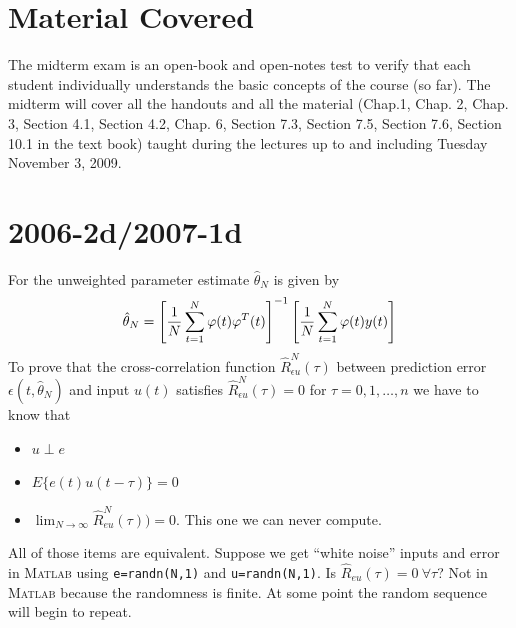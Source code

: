 
\mainmatter
\setcounter{page}{1}

\lectureseries[\course]{\course}

\date{November 5, 2009}

\setaddress

\setcounter{lecture}{20}
\setcounter{chapter}{20}


\section{Material Covered}
The midterm exam is an open-book and open-notes test to verify that each student individually understands the basic concepts of the course (so far). The midterm will cover all the handouts and all the material (Chap.1, Chap. 2, Chap. 3,  Section 4.1, Section 4.2, Chap. 6, Section 7.3, Section 7.5, Section 7.6, Section 10.1 in the text book) taught during the lectures up to and including Tuesday November 3, 2009.

\section{2006-2d/2007-1d}
For the unweighted parameter estimate $\hat{\theta}_N$ is given by
$$\hat{\theta}_N = \left[\frac{1}{N}\sum_{t=1}^N\varphi(t)\varphi^T(t)\right]^{-1}\left[\frac{1}{N}\sum_{t=1}^N\varphi(t)y(t)\right]$$
To prove that the cross-correlation function $\hat{R}_{\epsilon u}^N(\tau)$ between prediction error $\epsilon(t,\hat{\theta}_N)$ and input $u(t)$ satisfies $\hat{R}_{\epsilon u}^N(\tau)=0$ for $\tau=0,1,\ldots,n$ we have to know that
\begin{itemize}
\item $u\perp e$
\item $E\{e(t)u(t-\tau)\}=0$
\item $\lim_{N\to\infty}\hat{R}_{eu}^N(\tau))=0$. This one we can never compute.
\end{itemize}
All of those items are equivalent. Suppose we get ``white noise'' inputs and error in \textsc{Matlab} using \texttt{e=randn(N,1)} and \texttt{u=randn(N,1)}. Is $\hat{R}_{eu}(\tau)=0 ~\forall \tau$? Not in \textsc{Matlab} because the randomness is finite. At some point the random sequence will begin to repeat.

